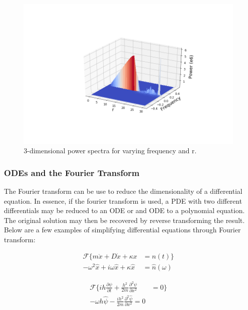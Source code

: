 \documentclass[twocolumn]{article}
\begin{document}
\begin{figure}[t]
\centering
\includegraphics[width=\linewidth]{power}
\caption{3-dimensional power spectra for varying frequency and r.}
\label{fig:power}
\end{figure}


\subsubsection{ODEs and the Fourier Transform}
The Fourier transform can be use to reduce the dimensionality of a differential equation. In essence, if the fourier transform is used, a PDE with two different differentials may be reduced to an ODE or and ODE to a polynomial equation. The original solution may then be recovered by reverse transforming the result. Below are a few examples of simplifying differential equations through Fourier transform:

\begin{equation}
\begin{split}
\mathcal{F} \{ m\ddot{x} + D\dot{x} + \kappa x &= n(t) \} \\
-\omega^2 \hat{x} +i\omega \hat{x} + \kappa\hat{x} &= \hat{n}(\omega)
\end{split}
\end{equation}

\begin{equation}
\begin{split}
\mathcal{F} \{ih \frac{\partial \psi}{\partial t} + \frac{h^2}{2m} \frac{\partial^2 \psi}{\partial x^2} &= 0 \} \\
-\omega h \hat{\psi} - \frac{ih^2}{2m} \frac{\partial^2 \hat{\psi}}{\partial x^2} = 0
\end{split}
\end{equation}
\end{document}
